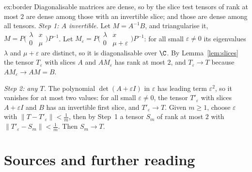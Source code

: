 \begin{solution}{ex:border}
\idea Diagonalisable matrices are dense, so by the slice test tensors of rank at most $2$ are dense among those with an
invertible slice; and those are dense among all tensors.
\writeup \emph{Step 1: $A$ invertible.} Let $M=A^{-1}B$, and triangularise it, $M=P\bigl(\begin{smallmatrix}\lambda&x\\0&\mu\end{smallmatrix}
\bigr)P^{-1}$. Let $M_\varepsilon=P\bigl(\begin{smallmatrix}\lambda&x\\0&\mu+\varepsilon\end{smallmatrix}\bigr)P^{-1}$: for all small
$\varepsilon\ne0$ its eigenvalues $\lambda$ and $\mu+\varepsilon$ are distinct, so it is diagonalisable over $\C$. By
Lemma~\ref{lem:slices} the tensor $T_\varepsilon$ with slices $A$ and $AM_\varepsilon$ has rank at most $2$, and $T_\varepsilon\to T$
because $AM_\varepsilon\to AM=B$.

\emph{Step 2: any $T$.} The polynomial $\det(A+\varepsilon I)$ in $\varepsilon$ has leading term $\varepsilon^2$, so it vanishes for at
most two values: for all small $\varepsilon\ne0$, the tensor $T'_\varepsilon$ with slices $A+\varepsilon I$ and $B$ has an invertible
first slice, and $T'_\varepsilon\to T$. Given $m\ge1$, choose $\varepsilon$ with $\|T-T'_\varepsilon\|<\frac1m$, then by Step~1 a tensor
$S_m$ of rank at most $2$ with $\|T'_\varepsilon-S_m\|<\frac1m$. Then $S_m\to T$.
\end{solution}

\section*{Sources and further reading}

